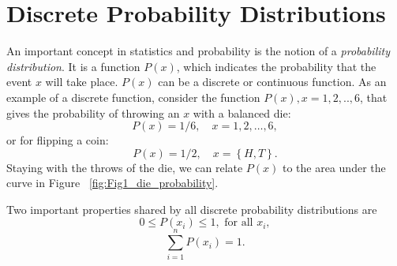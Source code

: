 
\section{Discrete Probability Distributions}

	An important concept in statistics and probability is the notion of a \emph{probability distribution}.  It is a 
function $P(x)$, which indicates the probability that the event $x$ will take place.  $P(x)$ can be a 
discrete or continuous function.  As an example of a discrete function, consider the function $P(x), x=1, 2,..,6$, that gives 
the probability of throwing an $x$ with a balanced die:
\begin{equation}
P(x) = 1/6,\quad x = 1,2, \ldots, 6,
\end{equation}	 
or for flipping a coin:
\begin{equation}
P(x) = 1/2,\quad x = \left \{ H, T \right \}.
\end{equation}	 
Staying with the throws of the die, we can relate $P(x)$ to the area under the curve in Figure ~\ref{fig:Fig1_die_probability}.


Two important properties shared by all discrete probability distributions are
\begin{equation}
0 \leq P (x_i) \leq 1, \mbox{ for all } x_i,
\end{equation}
\begin{equation}
\sum^n_{i=1} P(x_i) = 1.
\label{eq:Pdiscretesum}
\end{equation}	 
